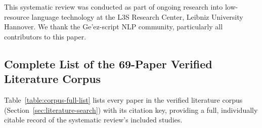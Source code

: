 \documentclass[sn-mathphys-num]{sn-jnl}
\theoremstyle{thmstyleone}
\theoremstyle{thmstyletwo}
\theoremstyle{thmstylethree}
\begin{document}
\backmatter


This systematic review was conducted as part of ongoing research into low-resource language technology at the L3S Research Center, Leibniz University Hannover. We thank the Ge'ez-script NLP community, particularly all contributors to this paper.
\begin{appendices}

\section{Complete List of the 69-Paper Verified Literature Corpus}\label{app:corpus-list}

Table~\ref{table:corpus-full-list} lists every paper in the verified literature corpus (Section~\ref{sec:literature-search}) with its citation key, providing a full, individually citable record of the systematic review's included studies.


\end{appendices}
\end{document}
